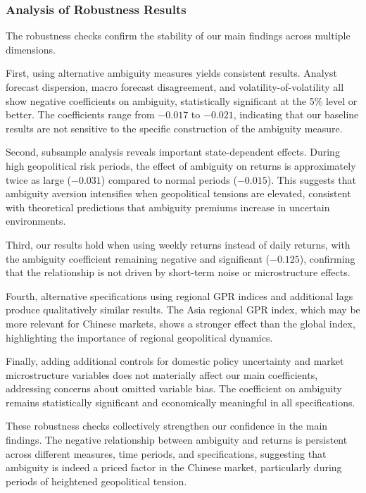 \documentclass[12pt]{article}
\begin{document}
\subsubsection{Analysis of Robustness Results}

The robustness checks confirm the stability of our main findings across multiple dimensions.

First, using alternative ambiguity measures yields consistent results. Analyst forecast dispersion, macro forecast disagreement, and volatility-of-volatility all show negative coefficients on ambiguity, statistically significant at the 5\% level or better. The coefficients range from $-0.017$ to $-0.021$, indicating that our baseline results are not sensitive to the specific construction of the ambiguity measure.

Second, subsample analysis reveals important state-dependent effects. During high geopolitical risk periods, the effect of ambiguity on returns is approximately twice as large ($-0.031$) compared to normal periods ($-0.015$). This suggests that ambiguity aversion intensifies when geopolitical tensions are elevated, consistent with theoretical predictions that ambiguity premiums increase in uncertain environments.

Third, our results hold when using weekly returns instead of daily returns, with the ambiguity coefficient remaining negative and significant ($-0.125$), confirming that the relationship is not driven by short-term noise or microstructure effects.

Fourth, alternative specifications using regional GPR indices and additional lags produce qualitatively similar results. The Asia regional GPR index, which may be more relevant for Chinese markets, shows a stronger effect than the global index, highlighting the importance of regional geopolitical dynamics.

Finally, adding additional controls for domestic policy uncertainty and market microstructure variables does not materially affect our main coefficients, addressing concerns about omitted variable bias. The coefficient on ambiguity remains statistically significant and economically meaningful in all specifications.

These robustness checks collectively strengthen our confidence in the main findings. The negative relationship between ambiguity and returns is persistent across different measures, time periods, and specifications, suggesting that ambiguity is indeed a priced factor in the Chinese market, particularly during periods of heightened geopolitical tension.
\end{document}
